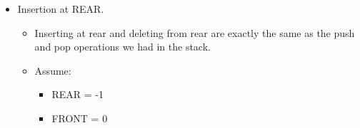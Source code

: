     
\begin{itemize}
    \item Insertion at REAR.
        \begin{itemize}
            \item Inserting at rear and deleting from rear are exactly the same as the push and pop operations we had in the stack.
            \item Assume:
                \begin{itemize}
                    \item REAR = -1
                    \item FRONT = 0
                \end{itemize}
        \end{itemize}
        \begin{center}
            \begin{tabular}{ |p{6cm}|p{6cm}| }


\end{tabular}
\end{center}
\end{itemize}
